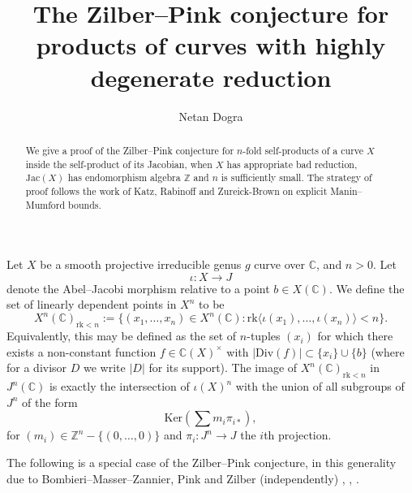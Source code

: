 \documentclass{amsart}
\def\Z{\mathbb Z}
\def\C{\mathbb C}
\newcommand{\rk}{\mathrm{rk}}
\newcommand{\Div}{\mathrm{Div}}
\theoremstyle{plain}
\theoremstyle{definition}
\newcommand{\Ker}{\mathrm{Ker}}
\newcommand{\Jac}{\mathrm{Jac}}
\begin{document}
\title{The Zilber--Pink conjecture for products of curves with highly degenerate reduction}
\author{Netan Dogra}
\maketitle
\pagestyle{headings}

\begin{abstract}
We give a proof of the Zilber--Pink conjecture for $n$-fold self-products of a curve $X$ inside the self-product of its Jacobian, when $X$ has appropriate bad reduction, $\Jac (X)$ has endomorphism algebra $\Z $ and $n$ is sufficiently small. The strategy of proof follows the work of Katz, Rabinoff and Zureick-Brown on explicit Manin--Mumford bounds.
\end{abstract}

Let $X$ be a smooth projective irreducible genus $g$ curve over $\mathbb{C}$, and $n>0$. Let 
\[
\iota :X\to J
\]
denote the Abel--Jacobi morphism relative to a point $b\in X(\mathbb{C})$. We define the set of linearly dependent points in $X^n $ to be
\[
X^n (\mathbb{C})_{\rk <n}:=\{ (x_1 ,\ldots ,x_n )\in X^n (\mathbb{C}):\rk \langle \iota (x_1 ),\ldots ,\iota (x_n ) \rangle <n \} .
\]
Equivalently, this may be defined as the set of $n$-tuples $(x_i )$ for which there exists a non-constant function $f\in \C (X)^\times $ with $|\Div (f)|\subset \{x_i \} \cup \{b \}$ (where for a divisor $D$ we write $|D|$ for its support). The image of $X^n (\mathbb{C})_{\rk <n}$ in $J^n (\mathbb{C})$ is exactly the intersection of $\iota (X)^n $ with the union of all subgroups of $J^n $ of the form
\begin{equation}\label{eqn:ker}
\Ker (\sum m_i \pi _{i *}),
\end{equation}
for $(m_i )\in \Z ^n -\{(0,\ldots ,0)\}$ and $\pi _i :J^n \to J$ the $i$th projection.

The following is a special case of the Zilber--Pink conjecture, in this generality due to Bombieri--Masser--Zannier, Pink and Zilber (independently) \cite{BMZ}, \cite{pink}, \cite{zilber}.
\end{document}
